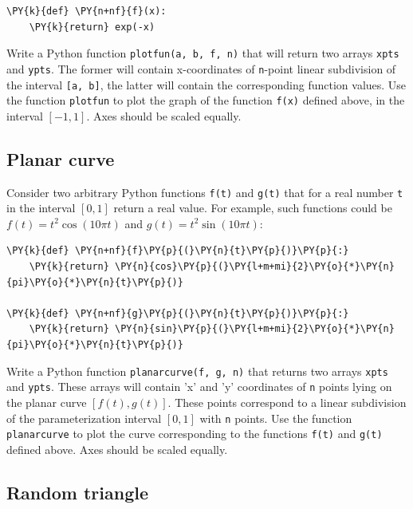 \begin{Verbatim}[commandchars=\\\{\}]
\PY{k}{def} \PY{n+nf}{f}(x):
    \PY{k}{return} exp(-x)
\end{Verbatim}
Write a Python function {\tt plotfun(a, b, f, n)} that will return two
arrays {\tt xpts} and {\tt ypts}. The former will contain x-coordinates of 
{\tt n}-point linear subdivision of the interval {\tt [a, b]}, the latter will
contain the corresponding function values. Use the function {\tt plotfun} to
plot the graph of the function {\tt f(x)} defined above, in the interval $[-1, 1]$.
Axes should be scaled equally.


\subsection{Planar curve}

Consider two arbitrary Python functions {\tt f(t)} and {\tt g(t)} that 
for a real number {\tt t} in the interval $[0, 1]$ return a real value. 
For example, such functions could be $f(t) = t^2 \cos(10 \pi t)$ and 
$g(t) = t^2 \sin(10 \pi t)$:

\begin{Verbatim}[commandchars=\\\{\}]
\PY{k}{def} \PY{n+nf}{f}\PY{p}{(}\PY{n}{t}\PY{p}{)}\PY{p}{:}
    \PY{k}{return} \PY{n}{cos}\PY{p}{(}\PY{l+m+mi}{2}\PY{o}{*}\PY{n}{pi}\PY{o}{*}\PY{n}{t}\PY{p}{)}

\PY{k}{def} \PY{n+nf}{g}\PY{p}{(}\PY{n}{t}\PY{p}{)}\PY{p}{:}
    \PY{k}{return} \PY{n}{sin}\PY{p}{(}\PY{l+m+mi}{2}\PY{o}{*}\PY{n}{pi}\PY{o}{*}\PY{n}{t}\PY{p}{)}
\end{Verbatim}
Write a Python function {\tt planarcurve(f, g, n)} that returns two
arrays {\tt xpts} and {\tt ypts}. These arrays will contain 'x' and 'y' coordinates of 
{\tt n} points lying on the planar curve $[f(t), g(t)]$. These points 
correspond to a linear subdivision of the parameterization interval 
$[0, 1]$ with {\tt n} points. Use the function {\tt planarcurve} to
plot the curve corresponding to the functions {\tt f(t)} and {\tt g(t)} 
defined above. Axes should be scaled equally.


\subsection{Random triangle}

